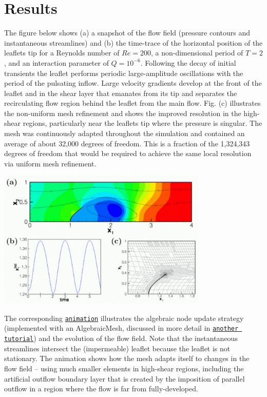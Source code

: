  

\hypertarget{index_results}{}\section{Results}\label{index_results}
The figure below shows (a) a snapshot of the flow field (pressure contours and instantaneous streamlines) and (b) the time-\/trace of the horizontal position of the leaflet\textquotesingle{}s tip for a Reynolds number of $ Re = 200 $, a non-\/dimensional period of $ T=2 $, and an interaction parameter of $ Q = 10^{-6} $. Following the decay of initial transients the leaflet performs periodic large-\/amplitude oscillations with the period of the pulsating inflow. Large velocity gradients develop at the front of the leaflet and in the shear layer that emanates from its tip and separates the recirculating flow region behind the leaflet from the main flow. Fig. (c) illustrates the non-\/uniform mesh refinement and shows the improved resolution in the high-\/shear regions, particularly near the leaflet\textquotesingle{}s tip where the pressure is singular. The mesh was continuously adapted throughout the simulation and contained an average of about 32,000 degrees of freedom. This is a fraction of the 1,324,343 degrees of freedom that would be required to achieve the same local resolution via uniform mesh refinement.

 
\begin{DoxyImage}
\includegraphics[width=0.75\textwidth]{flow_from_paper}
\end{DoxyImage}


The corresponding \href{../figures/fsi_channel_with_leaflet_flow.avi}{\tt animation} illustrates the algebraic node update strategy (implemented with an {\ttfamily Algebraic\+Mesh}, discussed in more detail in \href{../../fsi_collapsible_channel_algebraic/html/index.html}{\tt another tutorial}) and the evolution of the flow field. Note that the instantaneous streamlines intersect the (impermeable) leaflet because the leaflet is not stationary. The animation shows how the mesh adapts itself to changes in the flow field -- using much smaller elements in high-\/shear regions, including the artificial outflow boundary layer that is created by the imposition of parallel outflow in a region where the flow is far from fully-\/developed.



